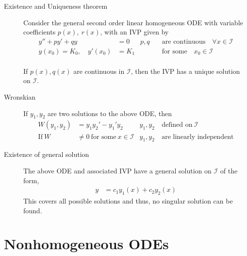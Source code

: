 \begin{description}
    \item[Existence and Uniqueness theorem]  Consider the general second order linear
        homogeneous ODE with variable coefficients $ p(x),\ r(x) $, with an IVP given by
        \begin{align}
            y'' + py' + qy                    & = 0     & p,q \quad & \text{are continuous} \quad \forall x\in \mathcal{I} \\
            y(x_{0}) = K_{0}, \quad y'(x_{0}) & = K_{1} &           & \text{for some} \quad x_{0} \in \mathcal{I}          \\
        \end{align}

        If $ p(x), q(x) $ are continuous in $ \mathcal{I} $, then the IVP has a unique
        solution on $ \mathcal{I} $.

    \item[Wronskian] If $ y_{1}, y_{2} $ are two solutions to the above ODE, then
        \begin{align}
            W(y_{1}, y_{2}) & = y_{1}y_{2}' - y_{1}'y_{2}                & y_{1}, y_{2} & \ \text{defined on}\ \mathcal{I}  \\
            \text{If}\ W    & \neq 0 \ \text{for some}\ x\in \mathcal{I} & y_{1}, y_{2} & \ \text{are linearly independent}
        \end{align}

    \item[Existence of general solution] The above ODE and associated IVP have a general solution
        on $ \mathcal{I} $ of the form,
        \begin{align}
            y & = c_{1}y_{1}(x) + c_{2}y_{2}(x)
        \end{align}
        This covers all possible solutions and thus, no singular solution can be found.
\end{description}


\section{Nonhomogeneous ODEs}

